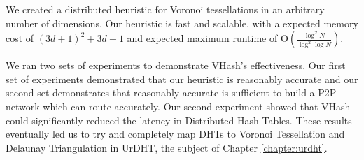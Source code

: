 We created a distributed heuristic for Voronoi tessellations in an arbitrary number of dimensions.
Our heuristic is fast and scalable, with a expected memory cost of $(3d+1)^{2}+3d+1$ and expected maximum runtime of O$(\frac{\log^{2} N}{\log^{2} \log N} )$.

We ran two sets of experiments to demonstrate VHash's effectiveness.
Our first set of experiments demonstrated that our heuristic is reasonably accurate  and our second set demonstrates that reasonably accurate is sufficient to build a P2P network which can route accurately.
Our second experiment showed that VHash could significantly reduced the latency in Distributed Hash Tables.
These results eventually led us to try and completely map DHTs to Voronoi Tessellation and Delaunay Triangulation in UrDHT, the subject of Chapter \ref{chapter:urdht}.